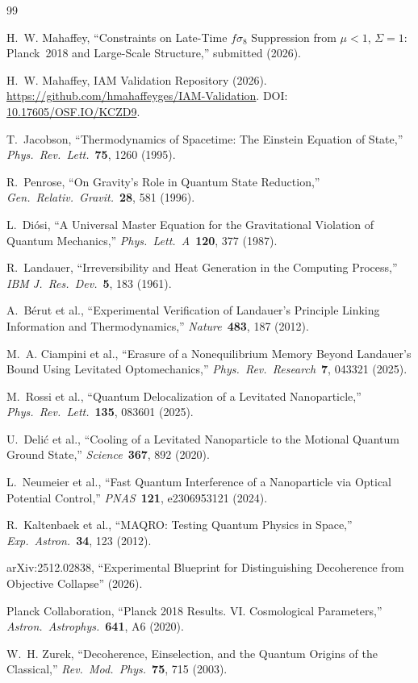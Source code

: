\documentclass[12pt,letterpaper]{article}
\begin{document}
\begin{thebibliography}{99}

H.~W. Mahaffey,
``Constraints on Late-Time $f\sigma_8$ Suppression from $\mu < 1$,
$\Sigma = 1$: Planck~2018 and Large-Scale Structure,''
submitted (2026).

H.~W. Mahaffey,
IAM Validation Repository (2026).
\url{https://github.com/hmahaffeyges/IAM-Validation}.
DOI: \href{https://doi.org/10.17605/OSF.IO/KCZD9}{10.17605/OSF.IO/KCZD9}.

T.~Jacobson,
``Thermodynamics of Spacetime: The Einstein Equation of State,''
\textit{Phys.\ Rev.\ Lett.}\ \textbf{75}, 1260 (1995).

R.~Penrose,
``On Gravity's Role in Quantum State Reduction,''
\textit{Gen.\ Relativ.\ Gravit.}\ \textbf{28}, 581 (1996).

L.~Di\'{o}si,
``A Universal Master Equation for the Gravitational Violation of Quantum
Mechanics,''
\textit{Phys.\ Lett.\ A}\ \textbf{120}, 377 (1987).

R.~Landauer,
``Irreversibility and Heat Generation in the Computing Process,''
\textit{IBM J.\ Res.\ Dev.}\ \textbf{5}, 183 (1961).

A.~B\'{e}rut et al.,
``Experimental Verification of Landauer's Principle Linking Information
and Thermodynamics,''
\textit{Nature}\ \textbf{483}, 187 (2012).

M.~A. Ciampini et al.,
``Erasure of a Nonequilibrium Memory Beyond Landauer's Bound Using
Levitated Optomechanics,''
\textit{Phys.\ Rev.\ Research}\ \textbf{7}, 043321 (2025).

M.~Rossi et al.,
``Quantum Delocalization of a Levitated Nanoparticle,''
\textit{Phys.\ Rev.\ Lett.}\ \textbf{135}, 083601 (2025).

U.~Deli\'{c} et al.,
``Cooling of a Levitated Nanoparticle to the Motional Quantum Ground State,''
\textit{Science}\ \textbf{367}, 892 (2020).

L.~Neumeier et al.,
``Fast Quantum Interference of a Nanoparticle via Optical Potential Control,''
\textit{PNAS}\ \textbf{121}, e2306953121 (2024).

R.~Kaltenbaek et al.,
``MAQRO: Testing Quantum Physics in Space,''
\textit{Exp.\ Astron.}\ \textbf{34}, 123 (2012).

arXiv:2512.02838,
``Experimental Blueprint for Distinguishing Decoherence from Objective
Collapse'' (2026).

Planck Collaboration,
``Planck 2018 Results. VI. Cosmological Parameters,''
\textit{Astron.\ Astrophys.}\ \textbf{641}, A6 (2020).

W.~H. Zurek,
``Decoherence, Einselection, and the Quantum Origins of the Classical,''
\textit{Rev.\ Mod.\ Phys.}\ \textbf{75}, 715 (2003).

\end{thebibliography}
\end{document}
